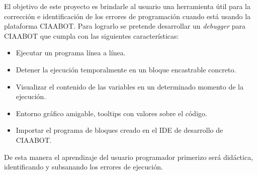 El objetivo de este proyecto es brindarle al usuario una herramienta útil para la
corrección e identificación de los errores de programación cuando está usando
la plataforma CIAABOT. Para lograrlo se pretende desarrollar un \emph{debugger} para
CIAABOT que cumpla con las siguientes características: 

\begin{itemize}
	\item Ejecutar un programa línea a línea.
	\item Detener la ejecución temporalmente en un bloque encastrable concreto.
	\item Visualizar el contenido de las variables en un determinado momento de la
	ejecución.
	\item Entorno gráfico amigable, tooltips con valores sobre el código.
	\item Importar el programa de bloques creado en el IDE de desarrollo de CIAABOT.	
\end{itemize}

De esta manera el aprendizaje del usuario programador primerizo será didáctica,
identificando y subsanando los errores de ejecución.







